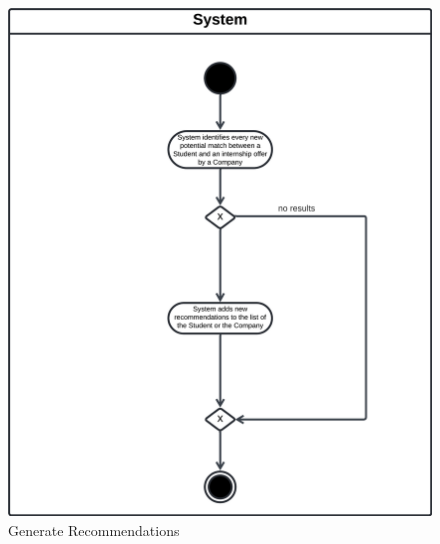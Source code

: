 \begin{figure}[H]
    \begin{center}
         \includegraphics[width=0.9\linewidth]{LaTeXCode/images/activity diagram/UC10.png}
         \caption{Generate Recommendations}
         \label{fig:generate_recommendations_ad}
     \end{center}
\end{figure}

\newpage

